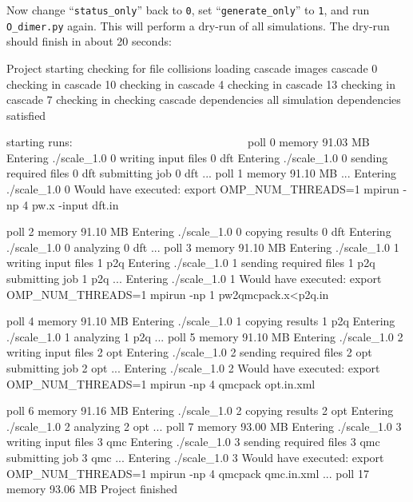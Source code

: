 Now change ``\texttt{status\_only}'' back to \texttt{0}, set ``\texttt{generate\_only}'' to \texttt{1}, and run \texttt{O\_dimer.py} again.  This will perform a dry-run of all simulations.  The dry-run should finish in about 20 seconds:
\ifws
\begin{shade}
Project starting 
  checking for file collisions 
  loading cascade images 
    cascade 0 checking in 
    cascade 10 checking in 
    cascade 4 checking in 
    cascade 13 checking in 
    cascade 7 checking in 
  checking cascade dependencies 
    all simulation dependencies satisfied 
  
  starting runs:
  ~~~~~~~~~~~~~~~~~~~~~~~~~~~~~~ 
  poll 0  memory 91.03 MB 
    Entering ./scale_1.0 0 
      writing input files  0 dft 
    Entering ./scale_1.0 0 
      sending required files  0 dft 
      submitting job  0 dft 
  ...
  poll 1  memory 91.10 MB 
  ...
    Entering ./scale_1.0 0 
      Would have executed:  
        export OMP_NUM_THREADS=1
        mpirun -np 4 pw.x -input dft.in 

  poll 2  memory 91.10 MB 
    Entering ./scale_1.0 0 
      copying results  0 dft 
    Entering ./scale_1.0 0 
      analyzing  0 dft 
  ...
  poll 3  memory 91.10 MB 
    Entering ./scale_1.0 1 
      writing input files  1 p2q 
    Entering ./scale_1.0 1 
      sending required files  1 p2q 
      submitting job  1 p2q 
  ...
    Entering ./scale_1.0 1 
      Would have executed:  
        export OMP_NUM_THREADS=1
        mpirun -np 1 pw2qmcpack.x<p2q.in 

  poll 4  memory 91.10 MB 
    Entering ./scale_1.0 1 
      copying results  1 p2q 
    Entering ./scale_1.0 1 
      analyzing  1 p2q 
  ...
  poll 5  memory 91.10 MB 
    Entering ./scale_1.0 2 
      writing input files  2 opt 
    Entering ./scale_1.0 2 
      sending required files  2 opt 
      submitting job  2 opt 
  ...
    Entering ./scale_1.0 2 
      Would have executed:  
        export OMP_NUM_THREADS=1
        mpirun -np 4 qmcpack opt.in.xml 

  poll 6  memory 91.16 MB 
    Entering ./scale_1.0 2 
      copying results  2 opt 
    Entering ./scale_1.0 2 
      analyzing  2 opt 
  ...
  poll 7  memory 93.00 MB 
    Entering ./scale_1.0 3 
      writing input files  3 qmc 
    Entering ./scale_1.0 3 
      sending required files  3 qmc 
      submitting job  3 qmc 
  ...
    Entering ./scale_1.0 3 
      Would have executed:  
        export OMP_NUM_THREADS=1
        mpirun -np 4 qmcpack qmc.in.xml 
  ...
  poll 17  memory 93.06 MB 
Project finished
\end{shade}

